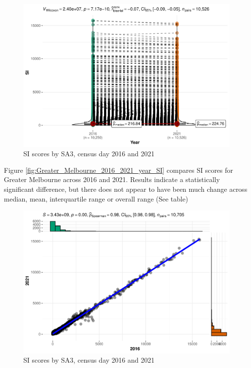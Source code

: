 \documentclass[preprint, 3p,
authoryear]{elsarticle} %
\begin{document}
\begin{figure}
\centering
\includegraphics{Leveraging_GTFS_to_assess_transit_supply_Transport_Geography_files/figure-latex/Greater_Melbourne_2016_2021_year_SI-1.pdf}
\caption{SI scores by SA3, census day 2016 and 2021}
\end{figure}

Figure \ref{fig:Greater_Melbourne_2016_2021_year_SI} compares SI scores
for Greater Melbourne across 2016 and 2021. Results indicate a
statistically significant difference, but there does not appear to have
been much change across median, mean, interquartile range or overall
range (See table)

\begin{figure}
\centering
\includegraphics{Leveraging_GTFS_to_assess_transit_supply_Transport_Geography_files/figure-latex/Greater_Melbourne_2016_2021_scatterplot-1.pdf}
\caption{SI scores by SA3, census day 2016 and 2021}
\end{figure}
\end{document}
